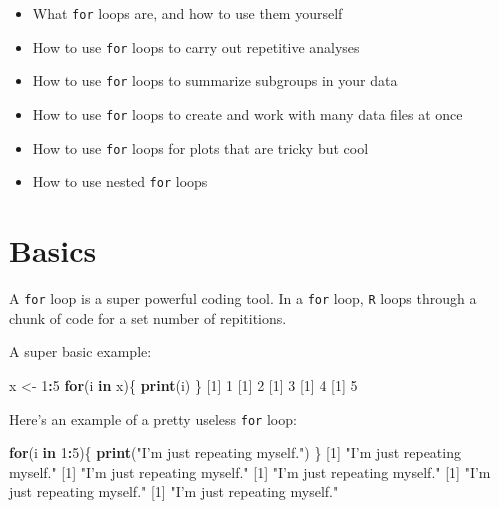 \documentclass[
]{book}
\newenvironment{Shaded}{\begin{snugshade}}{\end{snugshade}}
\newcommand{\ControlFlowTok}[1]{\textcolor[rgb]{0.13,0.29,0.53}{\textbf{#1}}}
\newcommand{\DecValTok}[1]{\textcolor[rgb]{0.00,0.00,0.81}{#1}}
\newcommand{\KeywordTok}[1]{\textcolor[rgb]{0.13,0.29,0.53}{\textbf{#1}}}
\newcommand{\NormalTok}[1]{#1}
\newcommand{\OperatorTok}[1]{\textcolor[rgb]{0.81,0.36,0.00}{\textbf{#1}}}
\newcommand{\StringTok}[1]{\textcolor[rgb]{0.31,0.60,0.02}{#1}}
\providecommand{\tightlist}{%
  \setlength{\itemsep}{0pt}\setlength{\parskip}{0pt}}
\begin{document}
\begin{itemize}
\tightlist
\item
  What \texttt{for} loops are, and how to use them yourself\\
\item
  How to use \texttt{for} loops to carry out repetitive analyses\\
\item
  How to use \texttt{for} loops to summarize subgroups in your data\\
\item
  How to use \texttt{for} loops to create and work with many data files at once\\
\item
  How to use \texttt{for} loops for plots that are tricky but cool\\
\item
  How to use nested \texttt{for} loops
\end{itemize}

\hypertarget{basics}{%
\section*{Basics}\label{basics}}

A \texttt{for} loop is a super powerful coding tool. In a \texttt{for} loop, \texttt{R} loops through a chunk of code for a set number of repititions.

A super basic example:

\begin{Shaded}
\begin{Highlighting}[]
\NormalTok{x <-}\StringTok{ }\DecValTok{1}\OperatorTok{:}\DecValTok{5}
\ControlFlowTok{for}\NormalTok{(i }\ControlFlowTok{in}\NormalTok{ x)\{}
  \KeywordTok{print}\NormalTok{(i)}
\NormalTok{\}}
\NormalTok{[}\DecValTok{1}\NormalTok{] }\DecValTok{1}
\NormalTok{[}\DecValTok{1}\NormalTok{] }\DecValTok{2}
\NormalTok{[}\DecValTok{1}\NormalTok{] }\DecValTok{3}
\NormalTok{[}\DecValTok{1}\NormalTok{] }\DecValTok{4}
\NormalTok{[}\DecValTok{1}\NormalTok{] }\DecValTok{5}
\end{Highlighting}
\end{Shaded}

Here's an example of a pretty useless \texttt{for} loop:

\begin{Shaded}
\begin{Highlighting}[]
\ControlFlowTok{for}\NormalTok{(i }\ControlFlowTok{in} \DecValTok{1}\OperatorTok{:}\DecValTok{5}\NormalTok{)\{}
  \KeywordTok{print}\NormalTok{(}\StringTok{"I'm just repeating myself."}\NormalTok{)}
\NormalTok{\}}
\NormalTok{[}\DecValTok{1}\NormalTok{] }\StringTok{"I'm just repeating myself."}
\NormalTok{[}\DecValTok{1}\NormalTok{] }\StringTok{"I'm just repeating myself."}
\NormalTok{[}\DecValTok{1}\NormalTok{] }\StringTok{"I'm just repeating myself."}
\NormalTok{[}\DecValTok{1}\NormalTok{] }\StringTok{"I'm just repeating myself."}
\NormalTok{[}\DecValTok{1}\NormalTok{] }\StringTok{"I'm just repeating myself."}
\end{Highlighting}
\end{Shaded}
\end{document}
